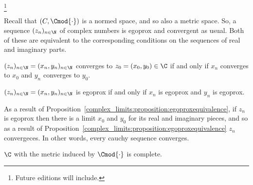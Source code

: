 
\footnote{Future editions will include.}


Recall that $(C, \Cmod{\cdot})$ is a normed space, and so also a metric space.
So, a sequence $(z_n)_{n \in \N}$ of complex numbers is egoprox and convergent as usual.
Both of these are equivalent to the corresponding conditions on the sequences of real and imaginary parts.

\begin{proposition}
  $(z_n)_{n \in \N} = (x_n, y_n)_{n \in \N}$ converges to $z_0 = (x_0, y_0) \in \C$ if and only if $x_n$ converges to $x_0$ and $y_n$ converges to $y_0$.
  \label{complex_limits:proposition:convergenceequivalence}
\end{proposition}

\begin{proposition}
  $(z_n)_{n \in \N} = (x_n, y_n)_{n \in \N}$ is egoprox if and only if $x_n$ is egoprox and $y_n$ is egoprox.
  \label{complex_limits:proposition:egoproxequivalence}
\end{proposition}


As a result of Proposition~\ref{complex_limits:proposition:egoproxequivalence}, if $z_n$ is egoprox then there is a limit $x_0$ and $y_0$ for its real and imaginary pieces, and so as a result of Proposition~\ref{complex_limits:proposition:egoproxequivalence} $z_n$ convergeces.
In other words, every cauchy sequence converges.

\begin{proposition}
  $\C$ with the metric induced by $\Cmod{\cdot}$ is complete.
\end{proposition}

\blankpage
